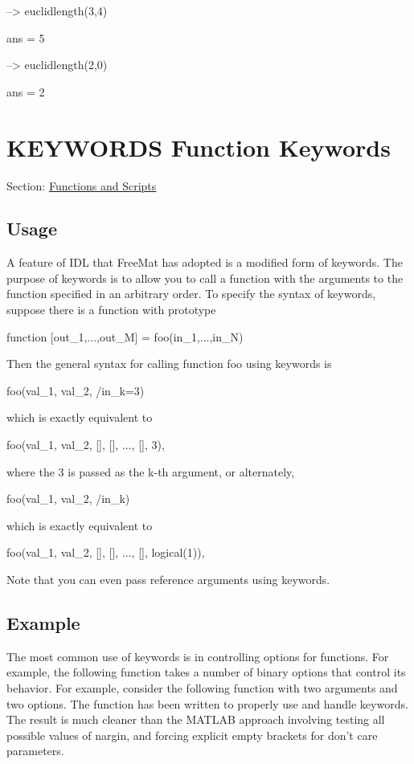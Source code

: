\begin{DoxyVerbInclude}
--> euclidlength(3,4)

ans = 
 5 

--> euclidlength(2,0)

ans = 
 2 
\end{DoxyVerbInclude}
 \hypertarget{functions_keywords}{}\section{K\-E\-Y\-W\-O\-R\-D\-S Function Keywords}\label{functions_keywords}
Section\-: \hyperlink{sec_functions}{Functions and Scripts} \hypertarget{vtkwidgets_vtkxyplotwidget_Usage}{}\subsection{Usage}\label{vtkwidgets_vtkxyplotwidget_Usage}
A feature of I\-D\-L that Free\-Mat has adopted is a modified form of {\ttfamily keywords}. The purpose of {\ttfamily keywords} is to allow you to call a function with the arguments to the function specified in an arbitrary order. To specify the syntax of {\ttfamily keywords}, suppose there is a function with prototype \begin{DoxyVerb}  function [out_1,...,out_M] = foo(in_1,...,in_N)
\end{DoxyVerb}
 Then the general syntax for calling function {\ttfamily foo} using keywords is \begin{DoxyVerb}  foo(val_1, val_2, /in_k=3)
\end{DoxyVerb}
 which is exactly equivalent to \begin{DoxyVerb}  foo(val_1, val_2, [], [], ..., [], 3),
\end{DoxyVerb}
 where the 3 is passed as the k-\/th argument, or alternately, \begin{DoxyVerb}  foo(val_1, val_2, /in_k)
\end{DoxyVerb}
 which is exactly equivalent to \begin{DoxyVerb}  foo(val_1, val_2, [], [], ..., [], logical(1)),
\end{DoxyVerb}
 Note that you can even pass reference arguments using keywords. \hypertarget{variables_struct_Example}{}\subsection{Example}\label{variables_struct_Example}
The most common use of keywords is in controlling options for functions. For example, the following function takes a number of binary options that control its behavior. For example, consider the following function with two arguments and two options. The function has been written to properly use and handle keywords. The result is much cleaner than the M\-A\-T\-L\-A\-B approach involving testing all possible values of {\ttfamily nargin}, and forcing explicit empty brackets for don't care parameters.

